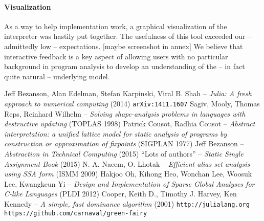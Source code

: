 \documentclass[11pt]{article}
\begin{document}
\paragraph{Visualization} As a way to help implementation work, a graphical visualization of the interpreter was hastily put together.
The usefulness of this tool exceeded our -- admittedly low -- expectations. [maybe screenshot in annex]
We believe that interactive feedback is a key aspect of allowing users with no particular background in program analysis to develop an understanding of the -- in fact quite natural -- underlying model.

\newpage

\begin{thebibliography}{9}
 Jeff Bezanson, Alan Edelman, Stefan Karpinski, Viral B. Shah -- \emph{Julia: A fresh approach to numerical computing} (2014) \verb~arXiv:1411.1607~
 Sagiv, Mooly, Thomas Reps, Reinhard Wilhelm -- \emph{Solving shape-analysis problems in languages with destructive updating} (TOPLAS 1998)
 Patrick Cousot, Radhia Cousot -- \emph{Abstract interpretation: a unified lattice model for static analysis of programs by construction or approximation of fixpoints} (SIGPLAN 1977)
 Jeff Bezanson -- \emph{Abstraction in Technical Computing} (2015)
 ``Lots of authors'' -- \emph{Static Single Assignment Book} (2015)
 N. A. Naeem, O. Lhotak -- \emph{Efficient alias set analysis using SSA form} (ISMM 2009)
 Hakjoo Oh, Kihong Heo, Wonchan Lee, Woosuk Lee, Kwangkeun Yi -- \emph{Design and Implementation of Sparse Global Analyses for C-like Languages} (PLDI 2012)
 Cooper, Keith D., Timothy J. Harvey, Ken Kennedy -- \emph{A simple, fast dominance algorithm} (2001)
 \verb~http://julialang.org~
 \verb~https://github.com/carnaval/green-fairy~
\end{thebibliography}
\end{document}
